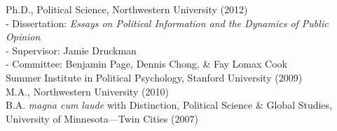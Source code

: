 \documentclass[12pt]{article}
\renewcommand{\section}[1]{\pagebreak[3]%
    \llap{\scshape\smash{\parbox[t]{\marginparwidth}{\raggedright {\color{lg}#1}}}}%
    \vspace{-\baselineskip}\par}
\newcommand{\entry}[1]{\indent {\color{lg}\guillemotright}\hspace{2pt}#1\vspace{.25em}\\}
\newcommand{\subentry}[1]{{\color{lg}-} #1\vspace{.25em}\\}
\begin{document}
\section{Education}
\entry{Ph.D., Political Science, Northwestern University (2012)}
	\subentry{Dissertation: \textit{Essays on Political Information and the Dynamics of Public Opinion}}
	\subentry{Supervisor: Jamie Druckman}
	\subentry{Committee: Benjamin Page, Dennis Chong, \& Fay Lomax Cook}
\entry{Summer Institute in Political Psychology, Stanford University (2009)}
\entry{M.A., Northwestern University (2010)}
\entry{B.A. \textit{magna cum laude} with Distinction, Political Science \& Global Studies, University of Minnesota---Twin Cities (2007)}
\end{document}
